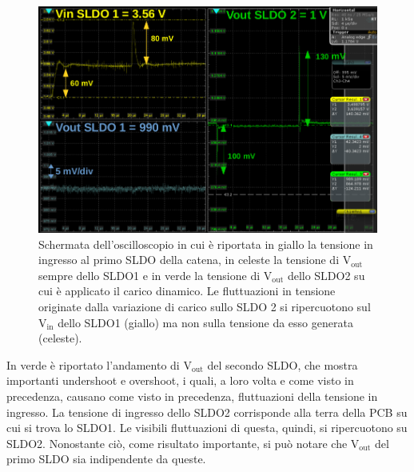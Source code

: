 \begin{figure}[h!]
\centering
\includegraphics[scale=.32]{Immagini/ScreenSerie}
\caption{Schermata dell'oscilloscopio in cui è riportata in giallo la tensione in ingresso al primo SLDO della catena,  in celeste la tensione di $\mathrm{V_{out}}$ sempre dello SLDO1 e in verde la tensione di $\mathrm{V_{out}}$ dello SLDO2 su cui è applicato il carico dinamico. Le fluttuazioni in tensione originate dalla variazione di carico sullo SLDO 2 si ripercuotono sul $\mathrm{V_{in}}$ dello SLDO1 (giallo) ma non sulla tensione da esso generata (celeste).}
\label{ScreenSerie}
\end{figure}
In verde è riportato l'andamento di $\mathrm{V_{out}}$ del secondo SLDO, che mostra importanti undershoot e overshoot, i quali, a loro volta e come visto in precedenza, causano come visto in precedenza, fluttuazioni della tensione in ingresso. 
La tensione di ingresso dello SLDO2 corrisponde alla terra della PCB su cui si trova lo SLDO1.
Le visibili fluttuazioni di questa, quindi, si ripercuotono su SLDO2.
Nonostante ciò, come risultato importante, si può notare che $\mathrm{V_{out}}$ del primo SLDO sia indipendente da queste.
